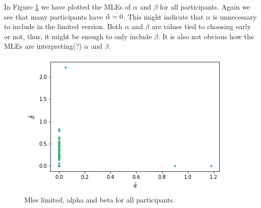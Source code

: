 In Figure \ref{fig:mles_limited_alpha_beta} we have plotted the MLEs of $\alpha$ and $\beta$ for all participants. Again we see that many participants have $\hat{\alpha}=0$. This might indicate that $\alpha$ is unnecessary to include in the limited version. Both $\alpha$ and $\beta$ are values tied to choosing early or not, thus, it might be enough to only include $\beta$. It is also not obvious how the MLEs are interpreting(?) $\alpha$ and $\beta$. 
\begin{figure}
    \centering
    \includegraphics[scale=0.38]{pictures/plotted_mles_limited_alpha_beta_gk1.png}
    \caption{Mles limited, alpha and beta for all participants.}
    \label{fig:mles_limited_alpha_beta}
\end{figure}



